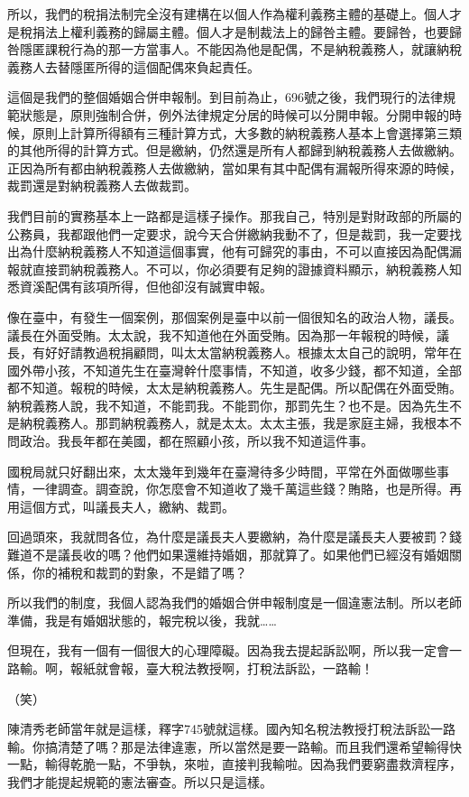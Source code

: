 \documentclass[oneside,sub3section]{ctexbook}
\begin{document}
所以，我們的稅捐法制完全沒有建構在以個人作為權利義務主體的基礎上。個人才是稅捐法上權利義務的歸屬主體。個人才是制裁法上的歸咎主體。要歸咎，也要歸咎隱匿課稅行為的那一方當事人。不能因為他是配偶，不是納稅義務人，就讓納稅義務人去替隱匿所得的這個配偶來負起責任。

這個是我們的整個婚姻合併申報制。到目前為止，696號之後，我們現行的法律規範狀態是，原則強制合併，例外法律規定分居的時候可以分開申報。分開申報的時候，原則上計算所得額有三種計算方式，大多數的納稅義務人基本上會選擇第三類的其他所得的計算方式。但是繳納，仍然還是所有人都歸到納稅義務人去做繳納。正因為所有都由納稅義務人去做繳納，當如果有其中配偶有漏報所得來源的時候，裁罰還是對納稅義務人去做裁罰。

我們目前的實務基本上一路都是這樣子操作。那我自己，特別是對財政部的所屬的公務員，我都跟他們一定要求，說今天合併繳納我動不了，但是裁罰，我一定要找出為什麼納稅義務人不知道這個事實，他有可歸究的事由，不可以直接因為配偶漏報就直接罰納稅義務人。不可以，你必須要有足夠的證據資料顯示，納稅義務人知悉資溪配偶有該項所得，但他卻沒有誠實申報。

像在臺中，有發生一個案例，那個案例是臺中以前一個很知名的政治人物，議長。議長在外面受賄。太太說，我不知道他在外面受賄。因為那一年報稅的時候，議長，有好好請教過稅捐顧問，叫太太當納稅義務人。根據太太自己的說明，常年在國外帶小孩，不知道先生在臺灣幹什麼事情，不知道，收多少錢，都不知道，全部都不知道。報稅的時候，太太是納稅義務人。先生是配偶。所以配偶在外面受賄。納稅義務人說，我不知道，不能罰我。不能罰你，那罰先生？也不是。因為先生不是納稅義務人。那罰納稅義務人，就是太太。太太主張，我是家庭主婦，我根本不問政治。我長年都在美國，都在照顧小孩，所以我不知道這件事。

國稅局就只好翻出來，太太幾年到幾年在臺灣待多少時間，平常在外面做哪些事情，一律調查。調查說，你怎麼會不知道收了幾千萬這些錢？賄賂，也是所得。再用這個方式，叫議長夫人，繳納、裁罰。

回過頭來，我就問各位，為什麼是議長夫人要繳納，為什麼是議長夫人要被罰？錢難道不是議長收的嗎？他們如果還維持婚姻，那就算了。如果他們已經沒有婚姻關係，你的補稅和裁罰的對象，不是錯了嗎？

所以我們的制度，我個人認為我們的婚姻合併申報制度是一個違憲法制。所以老師準備，我是有婚姻狀態的，報完稅以後，我就\ldots\ldots{}

但現在，我有一個有一個很大的心理障礙。因為我去提起訴訟啊，所以我一定會一路輸。啊，報紙就會報，臺大稅法教授啊，打稅法訴訟，一路輸！

（笑）

陳清秀老師當年就是這樣，釋字745號就這樣。國內知名稅法教授打稅法訴訟一路輸。你搞清楚了嗎？那是法律違憲，所以當然是要一路輸。而且我們還希望輸得快一點，輸得乾脆一點，不爭執，來啦，直接判我輸啦。因為我們要窮盡救濟程序，我們才能提起規範的憲法審查。所以只是這樣。
\end{document}
